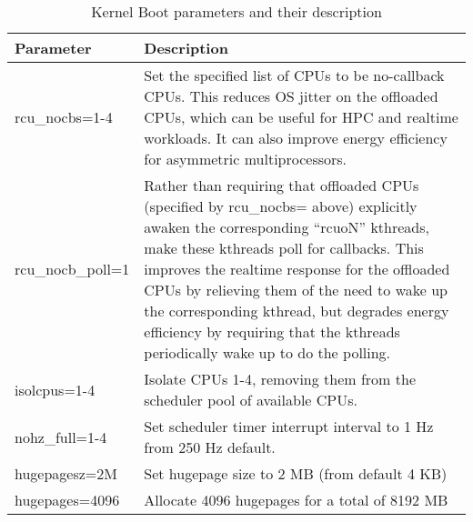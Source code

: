 \begin{table}
    \centering
    \caption{Kernel Boot parameters and their description}
    \label{tab:kernel_params_table}
\begin{tabular}{|l|p{10cm}|}
    \hline
    Parameter & Description \\
    \hline \hline
    rcu\_nocbs=1-4 & Set the specified list of CPUs to be no-callback CPUs.  This reduces OS jitter on the   offloaded CPUs, which can be useful for HPC and realtime workloads.  It can also improve energy efficiency for asymmetric multiprocessors. \\ 
    \hline
    rcu\_nocb\_poll=1 & Rather than requiring that offloaded CPUs (specified by rcu\_nocbs= above) explicitly awaken the corresponding ``rcuoN'' kthreads, make these kthreads poll for callbacks. This improves the realtime response for the offloaded CPUs by relieving them of the need to wake up the corresponding kthread, but degrades energy efficiency by requiring that the kthreads periodically wake up to do the polling. \\
    \hline
    isolcpus=1-4 & Isolate CPUs 1-4, removing them from the scheduler pool of available CPUs. \\ 
    \hline
    nohz\_full=1-4 & Set scheduler timer interrupt interval to 1 Hz from 250 Hz default. \\ 
    \hline
    hugepagesz=2M & Set hugepage size to 2 MB (from default 4 KB) \\
    \hline
    hugepages=4096 & Allocate 4096 hugepages for a total of 8192 MB \\ 
    \hline
\end{tabular}
\end{table}
